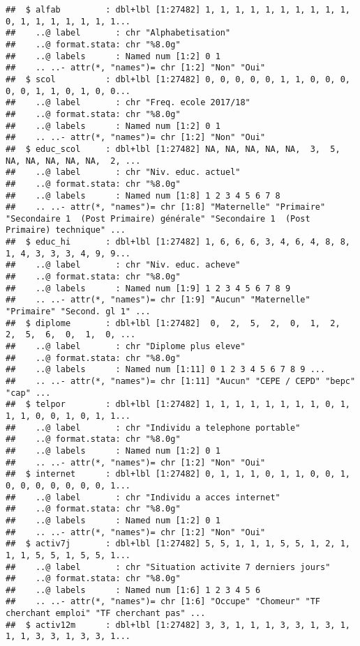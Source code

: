 \documentclass[
]{article}
\begin{document}
\begin{verbatim}
##  $ alfab         : dbl+lbl [1:27482] 1, 1, 1, 1, 1, 1, 1, 1, 1, 1, 0, 1, 1, 1, 1, 1, 1, 1...
##    ..@ label       : chr "Alphabetisation"
##    ..@ format.stata: chr "%8.0g"
##    ..@ labels      : Named num [1:2] 0 1
##    .. ..- attr(*, "names")= chr [1:2] "Non" "Oui"
##  $ scol          : dbl+lbl [1:27482] 0, 0, 0, 0, 0, 1, 1, 0, 0, 0, 0, 0, 1, 1, 0, 1, 0, 0...
##    ..@ label       : chr "Freq. ecole 2017/18"
##    ..@ format.stata: chr "%8.0g"
##    ..@ labels      : Named num [1:2] 0 1
##    .. ..- attr(*, "names")= chr [1:2] "Non" "Oui"
##  $ educ_scol     : dbl+lbl [1:27482] NA, NA, NA, NA, NA,  3,  5, NA, NA, NA, NA, NA,  2, ...
##    ..@ label       : chr "Niv. educ. actuel"
##    ..@ format.stata: chr "%8.0g"
##    ..@ labels      : Named num [1:8] 1 2 3 4 5 6 7 8
##    .. ..- attr(*, "names")= chr [1:8] "Maternelle" "Primaire" "Secondaire 1  (Post Primaire) générale" "Secondaire 1  (Post Primaire) technique" ...
##  $ educ_hi       : dbl+lbl [1:27482] 1, 6, 6, 6, 3, 4, 6, 4, 8, 8, 1, 4, 3, 3, 3, 4, 9, 9...
##    ..@ label       : chr "Niv. educ. acheve"
##    ..@ format.stata: chr "%8.0g"
##    ..@ labels      : Named num [1:9] 1 2 3 4 5 6 7 8 9
##    .. ..- attr(*, "names")= chr [1:9] "Aucun" "Maternelle" "Primaire" "Second. gl 1" ...
##  $ diplome       : dbl+lbl [1:27482]  0,  2,  5,  2,  0,  1,  2,  2,  5,  6,  0,  1,  0, ...
##    ..@ label       : chr "Diplome plus eleve"
##    ..@ format.stata: chr "%8.0g"
##    ..@ labels      : Named num [1:11] 0 1 2 3 4 5 6 7 8 9 ...
##    .. ..- attr(*, "names")= chr [1:11] "Aucun" "CEPE / CEPD" "bepc" "cap" ...
##  $ telpor        : dbl+lbl [1:27482] 1, 1, 1, 1, 1, 1, 1, 1, 0, 1, 1, 1, 0, 0, 1, 0, 1, 1...
##    ..@ label       : chr "Individu a telephone portable"
##    ..@ format.stata: chr "%8.0g"
##    ..@ labels      : Named num [1:2] 0 1
##    .. ..- attr(*, "names")= chr [1:2] "Non" "Oui"
##  $ internet      : dbl+lbl [1:27482] 0, 1, 1, 1, 0, 1, 1, 0, 0, 1, 0, 0, 0, 0, 0, 0, 0, 1...
##    ..@ label       : chr "Individu a acces internet"
##    ..@ format.stata: chr "%8.0g"
##    ..@ labels      : Named num [1:2] 0 1
##    .. ..- attr(*, "names")= chr [1:2] "Non" "Oui"
##  $ activ7j       : dbl+lbl [1:27482] 5, 5, 1, 1, 1, 5, 5, 1, 2, 1, 1, 1, 5, 5, 1, 5, 5, 1...
##    ..@ label       : chr "Situation activite 7 derniers jours"
##    ..@ format.stata: chr "%8.0g"
##    ..@ labels      : Named num [1:6] 1 2 3 4 5 6
##    .. ..- attr(*, "names")= chr [1:6] "Occupe" "Chomeur" "TF cherchant emploi" "TF cherchant pas" ...
##  $ activ12m      : dbl+lbl [1:27482] 3, 3, 1, 1, 1, 3, 3, 1, 3, 1, 1, 1, 3, 3, 1, 3, 3, 1...

\end{verbatim}
\end{document}
